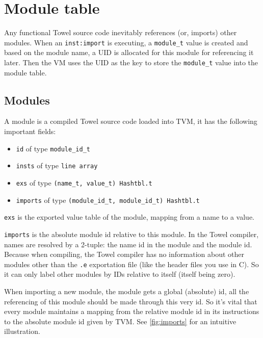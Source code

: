 \documentclass{report}
\newcommand{\inst}[1] {\texttt{inst:#1}}
\begin{document}
\section{Module table}

Any functional Towel source code inevitably references (or, imports) other modules. When an \inst{import} is executing, a \texttt{module\_t} value is created and based on the module name, a UID is allocated for this module for referencing it later. Then the VM uses the UID as the key to store the \texttt{module\_t} value into the module table.

\subsection{Modules}

A module is a compiled Towel source code loaded into TVM, it has the following important fields:
\begin{itemize}
\item \texttt{id} of type \texttt{module\_id\_t}
\item \texttt{insts} of type \texttt{line array}
\item \texttt{exs} of type \texttt{(name\_t, value\_t) Hashtbl.t}
\item \texttt{imports} of type \texttt{(module\_id\_t, module\_id\_t) Hashtbl.t}
\end{itemize}

\texttt{exs} is the exported value table of the module, mapping from a name to a value.

\texttt{imports} is the absolute module id relative to this module. In the Towel compiler, names are resolved by a 2-tuple: the name id in the module and the module id. Because when compiling, the Towel compiler has no information about other modules other than the \texttt{.e} exportation file (like the header files you use in C). So it can only label other modules by IDs relative to itself (itself being zero).

When importing a new module, the module gets a global (absolute) id, all the referencing of this module should be made through this very id. So it's vital that every module maintains a mapping from the relative module id in its instructions to the absolute module id given by TVM. See \ref{fig:imports} for an intuitive illustration.
\end{document}
